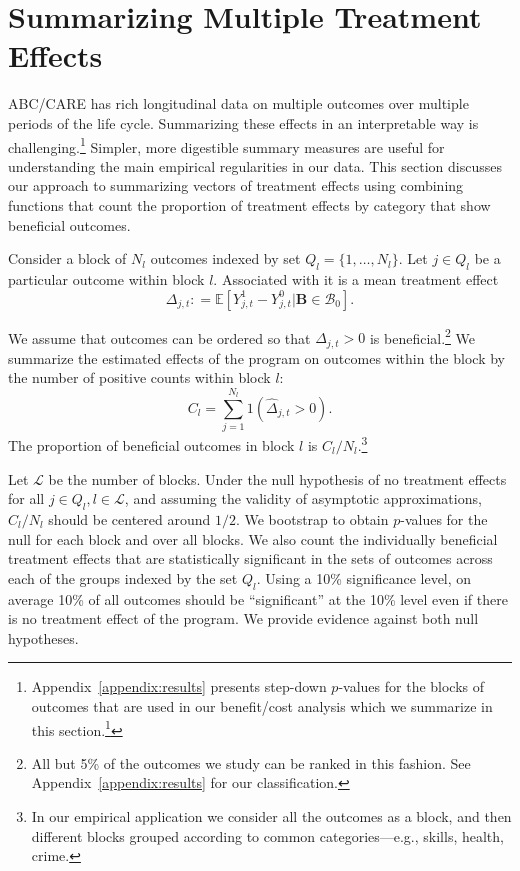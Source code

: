 \section{Summarizing Multiple Treatment Effects} \label{section:methodology}

ABC/CARE has rich longitudinal data on multiple outcomes over multiple periods of the life cycle. Summarizing these effects in an interpretable way is challenging.\footnote{Appendix~\ref{appendix:results} presents step-down $p$-values for the blocks of outcomes that are used in our benefit/cost analysis which we summarize in this section.\footnote{\citet{Lehman_Romano_2005_AnnStat,Romano_Shaikh_2006_AnnStat}.}} Simpler, more digestible summary measures are useful for understanding the main empirical regularities in our data. This section discusses our approach to summarizing vectors of treatment effects using combining functions that count the proportion of treatment effects by category that show beneficial outcomes.

Consider a block of $N_l$ outcomes indexed by set $Q_l = \{1,\dots,N_l\}$. Let $j \in Q_l$ be a particular outcome within block $l$. Associated with it is a mean treatment effect
\begin{equation}
\Delta_{j,t} : = \mathbb{E} \left[ Y^1_{j,t} - Y^0_{j,t} | \bm{B} \in \mathcal{B}_0 \right].
\end{equation}

We assume that outcomes can be ordered so that $\Delta_{j,t} >0$ is beneficial.\footnote{All but 5\% of the outcomes we study can be ranked in this fashion. See Appendix~\ref{appendix:results} for our classification.} We summarize the estimated effects of the program on outcomes within the block by the number of positive counts within block $l$:
\begin{equation}
C_l = \sum^{N_l}_{j=1} 1 (\hat{\Delta}_{j,t} >0).
\end{equation}
The proportion of beneficial outcomes in block $l$ is $C_l / N_l$.\footnote{In our empirical application we consider all the outcomes as a block, and then different blocks grouped according to common categories---e.g., skills, health, crime.}

Let $\mathcal{L}$ be the number of blocks. Under the null hypothesis of no treatment effects for all $j \in Q_l, l \in \mathcal{L}$, and assuming the validity of asymptotic approximations, $C_l / N_l$ should be centered around $1/2$. We bootstrap to obtain $p$-values for the null for each block and over all blocks. We also count the individually beneficial treatment effects that are statistically significant in the sets of outcomes across each of the groups indexed by the set $Q_l$. Using a 10\% significance level, on average 10\% of all outcomes should be ``significant'' at the 10\% level even if there is no treatment effect of the program. We provide evidence against both null hypotheses. 

